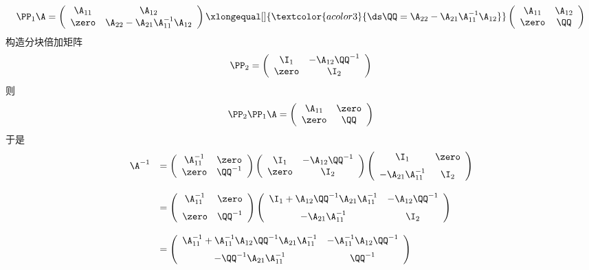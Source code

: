 \begin{frame}\ft{\secname}
\begin{jie}[续]
  $$
  \PP_1\A = \left(
    \begin{array}{cc}
      \A_{11} & \A_{12} \\
      \zero & \A_{22}-\A_{21}\A_{11}^{-1}\A_{12}
    \end{array}
  \right)\xlongequal[]{\textcolor{acolor3}{\ds \QQ=\A_{22}-\A_{21}\A_{11}^{-1}\A_{12}}}
  \left(
    \begin{array}{cc}
      \A_{11} & \A_{12} \\
      \zero & \QQ
    \end{array}
  \right)
  $$ \pause
  构造分块倍加矩阵
  $$
  \PP_2 = \left(
    \begin{array}{cc}
      \I_1 & -\A_{12}\QQ^{-1}\\
      \zero & \I_2
    \end{array}
  \right)
  $$ \pause
  则
  $$
  \PP_2\PP_1\A = \left(
    \begin{array}{cc}
      \A_{11} & \zero\\
      \zero & \QQ
    \end{array}
  \right)
  $$ \pause
  于是
  $$
  \begin{array}{rl}
    \A^{-1} & = \left(
      \begin{array}{cc}
        \A_{11}^{-1} & \zero\\
        \zero & \QQ^{-1}
      \end{array}
    \right)\left(
      \begin{array}{cc}
        \I_1 & -\A_{12}\QQ^{-1}\\
        \zero & \I_2
      \end{array}
    \right)\left(
      \begin{array}{cc}
        \I_1 & \zero\\[0.2cm]
        -\A_{21}\A_{11}^{-1} & \I_2
      \end{array}
    \right) \\[0.3in]
    & = \left(
      \begin{array}{cc}
        \A_{11}^{-1} & \zero\\[0.2cm]
        \zero & \QQ^{-1}
      \end{array}
    \right)\left(
      \begin{array}{cc}
        \I_1+ \A_{12}\QQ^{-1}\A_{21}\A_{11}^{-1}& -\A_{12}\QQ^{-1}\\[0.2cm]
        -\A_{21}\A_{11}^{-1} & \I_2
      \end{array}
    \right)\\[0.3in]
    & = \left(
      \begin{array}{cc}
        \A_{11}^{-1}+ \A_{11}^{-1}\A_{12}\QQ^{-1}\A_{21}\A_{11}^{-1}& -\A_{11}^{-1}\A_{12}\QQ^{-1}\\[0.2cm]
        -\QQ^{-1}\A_{21}\A_{11}^{-1} & \QQ^{-1}
      \end{array}
    \right)
  \end{array}
  $$
\end{jie}
\end{frame}

